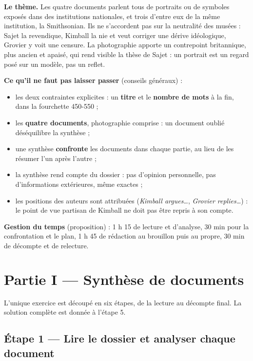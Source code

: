 \documentclass[11pt,a4paper]{article}
\providecommand{\tightlist}{\setlength{\itemsep}{0pt}\setlength{\parskip}{0pt}}
\begin{document}
\textbf{Le thème.} Les quatre documents parlent tous de portraits ou de symboles exposés dans des institutions nationales, et trois d'entre eux de la même institution, la Smithsonian. Ils ne s'accordent pas sur la neutralité des musées : Sajet la revendique, Kimball la nie et veut corriger une dérive idéologique, Grovier y voit une censure. La photographie apporte un contrepoint britannique, plus ancien et apaisé, qui rend visible la thèse de Sajet : un portrait est un regard posé sur un modèle, pas un reflet.

\textbf{Ce qu'il ne faut pas laisser passer} (conseils généraux) :

\begin{itemize}
\tightlist
\item
  les deux contraintes explicites : un \textbf{titre} et le \textbf{nombre de mots} à la fin, dans la fourchette 450-550 ;
\item
  les \textbf{quatre documents}, photographie comprise : un document oublié déséquilibre la synthèse ;
\item
  une synthèse \textbf{confronte} les documents dans chaque partie, au lieu de les résumer l'un après l'autre ;
\item
  la synthèse rend compte du dossier : pas d'opinion personnelle, pas d'informations extérieures, même exactes ;
\item
  les positions des auteurs sont attribuées (\emph{Kimball argues\ldots{}}, \emph{Grovier replies\ldots{}}) : le point de vue partisan de Kimball ne doit pas être repris à son compte.
\end{itemize}

\textbf{Gestion du temps} (proposition) : 1 h 15 de lecture et d'analyse, 30 min pour la confrontation et le plan, 1 h 45 de rédaction au brouillon puis au propre, 30 min de décompte et de relecture.

\hypertarget{partie-i-synthuxe8se-de-documents}{%
\section{Partie I --- Synthèse de documents}\label{partie-i-synthuxe8se-de-documents}}

L'unique exercice est découpé en six étapes, de la lecture au décompte final. La solution complète est donnée à l'étape 5.

\hypertarget{uxe9tape-1-lire-le-dossier-et-analyser-chaque-document}{%
\subsection{Étape 1 --- Lire le dossier et analyser chaque document}\label{uxe9tape-1-lire-le-dossier-et-analyser-chaque-document}}
\end{document}
